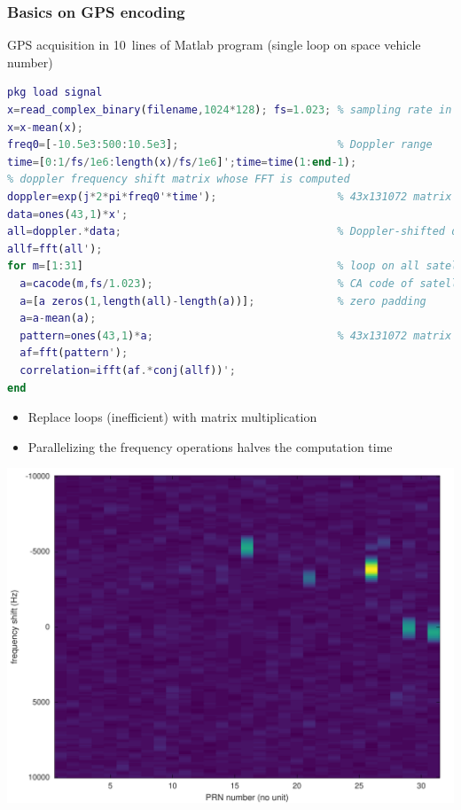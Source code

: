 \documentclass[compress,10pt]{beamer}
\begin{document}
\begin{frame}[fragile]\frametitle{Basics on GPS encoding}

GPS acquisition in 10~lines of Matlab program (single loop on space vehicle number)

\begin{lstlisting}[language=Matlab]
pkg load signal
x=read_complex_binary(filename,1024*128); fs=1.023; % sampling rate in MHz
x=x-mean(x);
freq0=[-10.5e3:500:10.5e3];                         % Doppler range
time=[0:1/fs/1e6:length(x)/fs/1e6]';time=time(1:end-1);
% doppler frequency shift matrix whose FFT is computed
doppler=exp(j*2*pi*freq0'*time');                   % 43x131072 matrix
data=ones(43,1)*x';
all=doppler.*data;                                  % Doppler-shifted data
allf=fft(all');
for m=[1:31]                                        % loop on all satellites
  a=cacode(m,fs/1.023);                             % CA code of satellite m
  a=[a zeros(1,length(all)-length(a))];             % zero padding
  a=a-mean(a);
  pattern=ones(43,1)*a;                             % 43x131072 matrix
  af=fft(pattern');
  correlation=ifft(af.*conj(allf))';
end
\end{lstlisting}

\vspace{-0.71cm}
\begin{minipage}[t]{\linewidth}
\begin{minipage}{.49\linewidth}
{\footnotesize 
\begin{itemize}
\item Replace loops (inefficient) with matrix multiplication
\item Parallelizing the frequency operations halves the computation time
\end{itemize}
}
\end{minipage}
\begin{minipage}{.49\linewidth}
\includegraphics[width=\linewidth]{../190524gps_xcorr/gps_bin100Hz}
\end{minipage}
\end{minipage}
\end{frame}
\end{document}
